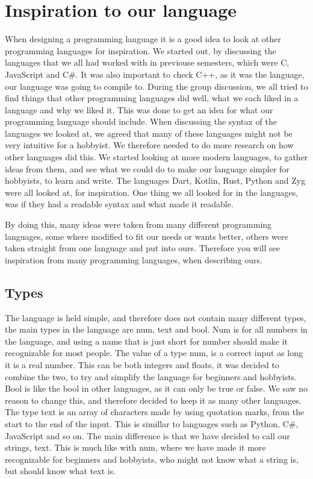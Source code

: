 \section{Inspiration to our language}
When designing a programming language it is a good idea to look at other programming languages for inspiration. We started out, by discussing the languages that we all had worked with in previouse semesters, which were C, JavaScript and C\#. It was also important to check C++, as it was the language, our language was going to compile to.
During the group discussion, we all tried to find things that other programming languages did well, what we each liked in a language and why we liked it. This was done to get an idea for what our programming language should include.
When discussing the syntax of the languages we looked at, we agreed that many of these languages might not be very intuitive for a hobbyist. We therefore needed to do more research on how other languages did this. 
We started looking at more modern languages, to gather ideas from them, and see what we could do to make our language simpler for hobbyists, to learn and write. The languages Dart, Kotlin, Rust, Python and Zyg were all looked at, for inspiration. One thing we all looked for in the languages, was if they had a readable syntax and what made it readable.

By doing this, many ideas were taken from many different programming languages, some where modified to fit our needs or wants better, others were taken straight from one language and put into ours. Therefore you will see inspiration from many programming languages, when describing ours.  



\subsection{Types}
The language is held simple, and therefore does not contain many different types, the main types in the language are num, text and bool. Num is for all numbers in the language, and using a name that is just short for number should make it recognizable for most people. The value of a type num, is a correct input as long it is a real number. This can be both integers and floats, it was decided to combine the two, to try and simplify the language for beginners and hobbyists.
Bool is like the bool in other languages, as it can only be true or false. We saw no reason to change this, and therefore decided to keep it as many other languages.
The type text is an array of characters made by using quotation marks, from the start to the end of the input.  This is simillar to languages such as Python, C\#, JavaScript and so on. The main difference is that we have decided to call our strings, text. This is much like with num, where we have made it more recognizable for beginners and hobbyists, who might not know what a string is, but should know what text is.
 
